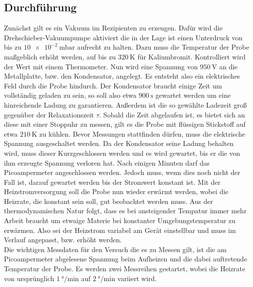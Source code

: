 \subsection{Durchführung}
Zunächst gilt es ein Vakuum im Rezipienten zu erzeugen. Dafür wird die Drehschieber-Vakuumpumpe
aktiviert die in der Lage ist einen Unterdruck von bis zu $\SI{10e-2}{\milli\bar}$ aufrecht zu halten.
Dazu muss die Temperatur der Probe maßgeblich erhöht werden, auf bis zu $\SI{320}{\kelvin}$ für Kaliumbromit. Kontrolliert wird der Wert mit einem Thermometer.
Nun wird eine Spannung von $\SI{950}{\volt}$ an die Metallplatte, bzw. den Kondensator, angelegt. Es entsteht also ein elektrisches 
Feld durch die Probe hindurch. Der Kondensator braucht einige Zeit um vollständig geladen zu sein,
so soll also etwa $\SI{900}{\second}$ gewartet werden um eine hinreichende Ladung zu garantieren.
Außerdem ist die so gewählte Ladezeit groß gegenüber der Relaxationszeit $\tau$.
Sobald die Zeit abgelaufen ist, es bietet sich an diese mit einer Stoppuhr zu messen,
gilt es die Probe mit flüssigen Stickstoff auf etwa $\SI{210}{\kelvin}$ zu kühlen.
Bevor Messungen stattfinden dürfen, muss die elektrische Spannung ausgeschaltet werden.
Da der Kondensator seine Ladung behalten wird,
muss dieser Kurzgeschlossen werden und es wird gewartet, bis er die von ihm erzeugte Spannung verloren hat.
Nach einigen Minuten darf das Picoampermeter angeschlossen werden. Jedoch muss,
wenn dies noch nicht der Fall ist, darauf gewartet werden bis der Stromwert konstant ist.
Mit der Heizstromversorgung soll die Probe nun wieder erwärmt werden, wobei die 
Heizrate, die konstant sein soll, gut beobachtet werden muss. Aus der thermodynamischen Natur 
folgt, dass es bei ansteigender Tempatur immer mehr Arbeit braucht um etwaige Materie bei 
konstanter Umgebungstemperatur zu erwärmen. Also sei der Heizstrom variabel am Gerät
einstellbar und muss im Verlauf angepasst, bzw. erhöht werden.
\\
\newline
Die wichtigen Messdaten für den Versuch die es zu Messen gilt, ist die am Picoampermeter 
abgelesene Spannung beim Aufheizen und die dabei auftretende Temperatur der Probe.
Es werden zwei Messreihen gestartet, wobei die Heizrate von ursprünglich $\SI{1}{\degree\per\minute}$
auf $\SI{2}{\degree\per\minute}$ variiert wird.